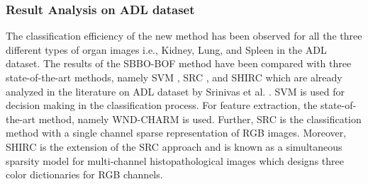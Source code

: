 \subsubsection{Result Analysis on ADL dataset}
 
The classification efficiency of the new method has been observed for all the three different types of organ images i.e., Kidney, Lung, and Spleen in the ADL dataset. The results of the SBBO-BOF method have been compared with three state-of-the-art methods, namely SVM \cite{Chapelle1999}, SRC \cite{wright2009}, and SHIRC which are already analyzed in the literature on ADL dataset by Srinivas et al. \cite{srinivas2014}. SVM is used for decision making in the classification process. For feature extraction, the state-of-the-art method, namely WND-CHARM \cite{orlov2008} is used. Further, SRC is the classification method with a single channel sparse representation of RGB images. Moreover, SHIRC is the extension of the SRC approach and is known as a simultaneous sparsity model for multi-channel histopathological images which designs three color dictionaries for RGB channels. 

